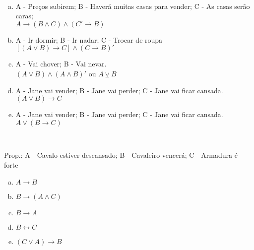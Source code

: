 \begin{Gabarito}{7}
~
    \begin{enumerate}[a)]
      \item A - Preços subirem; B - Haverá muitas casas para vender; C - As casas serão caras; \\ $ A \rightarrow (B \wedge C) \wedge (C' \rightarrow B) $
      \item A - Ir dormir; B - Ir nadar; C - Trocar de roupa \\ $[(A \vee B) \rightarrow C] \wedge (C \rightarrow B)'$
      \item A - Vai chover; B - Vai nevar. \\ $(A \vee B) \wedge (A \wedge B)'$ ou $ A \veebar B $
      \item A - Jane vai vender; B - Jane vai perder; C - Jane vai ficar cansada. \\ $(A \vee B) \rightarrow C$
      \item A - Jane vai vender; B - Jane vai perder; C - Jane vai ficar cansada. \\ $A \vee (B \rightarrow C)$

    \end{enumerate}
  
\end{Gabarito}
\begin{Gabarito}{8}
~

    Prop.: A - Cavalo estiver descansado; B - Cavaleiro vencerá; C - Armadura é forte

    \begin{multicols}{4}
    \begin{enumerate}[a)]
      \item $ A \rightarrow B$
      \item $B \rightarrow (A \wedge C)$
      \item $B \rightarrow A$
      \item $B \leftrightarrow C$
      \item $(C \vee A) \rightarrow B$
    \end{enumerate}
  \end{multicols}
  
\end{Gabarito}
